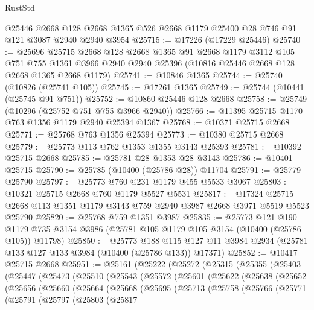 \begin{lexlean}{RustStd}
\begin{coremodule}
    @25446
    @2668
    @128
    @2668
    @1365
    @526
    @2668
    @1179
    @25400
    @28
    @746
    @91
    @121
    @3087
    @2940
    @2940
    @3954
@25715 := @17226 (@17229 @25446)
@25740 := @25696
    @25715
    @2668
    @128
    @2668
    @1365
    @91
    @2668
    @1179
    @3112
    @105
    @751
    @755
    @1361
    @3966
    @2940
    @2940
    @25396
    (@10816 @25446 @2668 @128 @2668 @1365 @2668 @1179)
@25741 := @10846 @1365
@25744 := @25740 (@10826 (@25741 @105))
@25745 := @17261 @1365
@25749 := @25744 (@10441 (@25745 @91 @751))
@25752 := @10860 @25446 @128 @2668
@25758 := @25749 (@10296 (@25752 @751 @755 @3966 @2940))
@25766 := @11395 @25715 @1170 @763 @1356 @1179 @2940 @25394 @1367
@25768 := @10371 @25715 @2668
@25771 := @25768 @763 @1356 @25394
@25773 := @10380 @25715 @2668
@25779 := @25773 @113 @762 @1353 @1355 @3143 @25393
@25781 := @10392 @25715 @2668
@25785 := @25781 @28 @1353 @28 @3143
@25786 := @10401 @25715
@25790 := @25785 (@10400 (@25786 @28)) @11704
@25791 := @25779 @25790
@25797 := @25773 @760 @231 @1179 @455 @5533 @3067
@25803 := @10321 @25715 @2668 @760 @1179 @5527 @5531
@25817 := @17324 @25715 @2668 @113 @1351 @1179 @3143 @759 @2940 @3987 @2668 @3971 @5519 @5523 @25790
@25820 := @25768 @759 @1351 @3987
@25835 := @25773
    @121
    @190
    @1179
    @735
    @3154
    @3986
    (@25781 @105 @1179 @105 @3154 (@10400 (@25786 @105)) @11798)
@25850 := @25773
    @188
    @115
    @127
    @11
    @3984
    @2934
    (@25781 @133 @127 @133 @3984 (@10400 (@25786 @133)) @17371)
@25852 := @10417 @25715 @2668
@25951 := @25161
    (@25222
      (@25272
        (@25315
          (@25355
            (@25403
              (@25447
                (@25473
                  (@25510
                    (@25543
                      (@25572
                        (@25601
                          (@25622
                            (@25638
                              (@25652
                                (@25656
                                  (@25660
                                    (@25664
                                      (@25668
                                        (@25695
                                          (@25713
                                            (@25758
                                              (@25766
                                                (@25771
                                                  (@25791
                                                    (@25797
                                                      (@25803
                                                        (@25817

\end{coremodule}
\end{lexlean}
